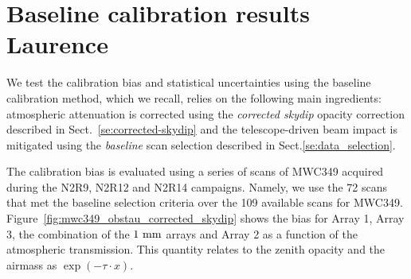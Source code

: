 

\section{Baseline calibration results {\color{LimeGreen} Laurence}}
\label{se:photometry_baseline}

We test the calibration bias and statistical uncertainties using the
baseline calibration method, which we recall, relies on the following
main ingredients: atmospheric attenuation is corrected using
the \emph{corrected skydip} opacity correction described in
Sect.~\ref{se:corrected-skydip}
and the telescope-driven beam impact is mitigated using the
\emph{baseline} scan selection described in
Sect.\ref{se:data_selection}.

The calibration bias is evaluated using a series of scans of MWC349
acquired during the N2R9, N2R12 and N2R14 campaigns. Namely, we use
the 72 scans that met the baseline selection criteria over the 109
available scans for MWC349.
Figure~\ref{fig:mwc349_obstau_corrected_skydip} shows the
bias for Array 1, Array 3, the combination of the $1~\rm{mm}$ arrays and
Array 2 as a function of the atmospheric transmission. This quantity
relates to the zenith opacity and the airmass as
$\exp \left( - \tau \cdot x \right) $.


